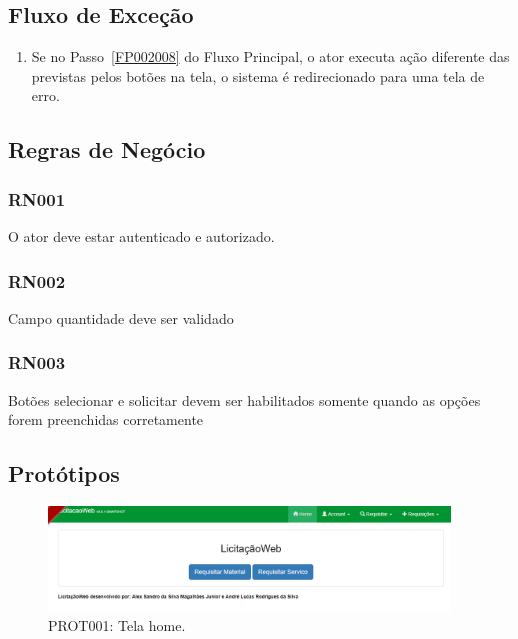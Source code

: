 \begin{anexosenv}
\subsection*{Fluxo de Exceção}
\begin{enumerate}
    \item Se no Passo~\ref{FP002008} do Fluxo Principal, o ator executa ação diferente das previstas pelos botões na tela, o sistema é redirecionado para uma tela de erro.
\end{enumerate}


\subsection*{Regras de Negócio}

\subsubsection*{RN001}\label{rn002}
O ator deve estar autenticado e autorizado.

\subsubsection*{RN002}\label{rn003}
Campo quantidade deve ser validado

\subsubsection*{RN003}\label{rn004}
Botões selecionar e solicitar devem ser habilitados somente quando as opções forem preenchidas corretamente

\subsection*{Protótipos}
\begin{figure}[htbp]
    \centering
    \includegraphics[width=0.95\textwidth]{figuras/prototipo001.png}
    \caption[PROT001]{PROT001: Tela home.}
    \label{PROT001}
\end{figure}


\end{anexosenv}
